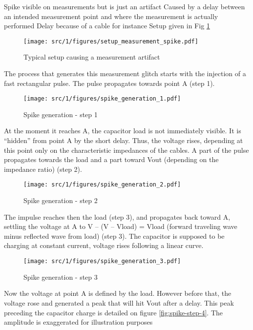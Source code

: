 Spike visible on measurements but is just an artifact
Caused by a delay between an intended measurement point and where the measurement is actually performed
Delay because of a cable for instance
Setup given in Fig \ref{fig:setup-measurement-spike}

\begin{figure}[!h]
  \centering
  \texttt{[image: src/1/figures/setup\_measurement\_spike.pdf]}
  \caption{Typical setup causing a measurement artifact}
  \label{fig:setup-measurement-spike}
\end{figure}

The process that generates this measurement glitch starts with the injection of a fast rectangular pulse.
The pulse propagates towards point A (step 1).

\begin{figure}[!h]
  \centering
  \texttt{[image: src/1/figures/spike\_generation\_1.pdf]}
  \caption{Spike generation - step 1}
  \label{fig:spike-step-1}
\end{figure}

At the moment it reaches A, the capacitor load is not immediately visible.
It is “hidden” from point A by the short delay.
Thus, the voltage rises, depending at this point only on the characteristic impedances of the cables.
A part of the pulse propagates towards the load and a part toward Vout (depending on the impedance ratio) (step 2).

\begin{figure}[!h]
  \centering
  \texttt{[image: src/1/figures/spike\_generation\_2.pdf]}
  \caption{Spike generation - step 2}
  \label{fig:spike-step-2}
\end{figure}

The impulse reaches then the load (step 3), and propagates back toward A, settling the voltage at A to
V – (V – Vload) = Vload (forward traveling wave minus reflected wave from load) (step 3).
The capacitor is supposed to be charging at constant current, voltage rises following a linear curve.

\begin{figure}[!h]
  \centering
  \texttt{[image: src/1/figures/spike\_generation\_3.pdf]}
  \caption{Spike generation - step 3}
  \label{fig:spike-step-3}
\end{figure}

Now the voltage at point A is defined by the load.
However before that, the voltage rose and generated a peak that will hit Vout after a delay.
This peak preceding the capacitor charge is detailed on figure \ref{fig:spike-step-4}.
The amplitude is exaggerated for illustration purposes

